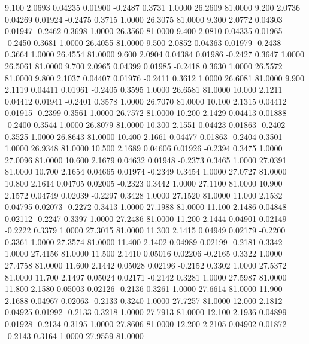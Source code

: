    9.100   2.0693   0.04235   0.01900  -0.2487   0.3731   1.0000  26.2609  81.0000
   9.200   2.0736   0.04269   0.01924  -0.2475   0.3715   1.0000  26.3075  81.0000
   9.300   2.0772   0.04303   0.01947  -0.2462   0.3698   1.0000  26.3560  81.0000
   9.400   2.0810   0.04335   0.01965  -0.2450   0.3681   1.0000  26.4055  81.0000
   9.500   2.0852   0.04363   0.01979  -0.2438   0.3664   1.0000  26.4554  81.0000
   9.600   2.0904   0.04384   0.01986  -0.2427   0.3647   1.0000  26.5061  81.0000
   9.700   2.0965   0.04399   0.01985  -0.2418   0.3630   1.0000  26.5572  81.0000
   9.800   2.1037   0.04407   0.01976  -0.2411   0.3612   1.0000  26.6081  81.0000
   9.900   2.1119   0.04411   0.01961  -0.2405   0.3595   1.0000  26.6581  81.0000
  10.000   2.1211   0.04412   0.01941  -0.2401   0.3578   1.0000  26.7070  81.0000
  10.100   2.1315   0.04412   0.01915  -0.2399   0.3561   1.0000  26.7572  81.0000
  10.200   2.1429   0.04413   0.01888  -0.2400   0.3544   1.0000  26.8079  81.0000
  10.300   2.1551   0.04423   0.01863  -0.2402   0.3525   1.0000  26.8643  81.0000
  10.400   2.1661   0.04477   0.01863  -0.2404   0.3501   1.0000  26.9348  81.0000
  10.500   2.1689   0.04606   0.01926  -0.2394   0.3475   1.0000  27.0096  81.0000
  10.600   2.1679   0.04632   0.01948  -0.2373   0.3465   1.0000  27.0391  81.0000
  10.700   2.1654   0.04665   0.01974  -0.2349   0.3454   1.0000  27.0727  81.0000
  10.800   2.1614   0.04705   0.02005  -0.2323   0.3442   1.0000  27.1100  81.0000
  10.900   2.1572   0.04749   0.02039  -0.2297   0.3428   1.0000  27.1520  81.0000
  11.000   2.1532   0.04795   0.02073  -0.2272   0.3413   1.0000  27.1988  81.0000
  11.100   2.1486   0.04848   0.02112  -0.2247   0.3397   1.0000  27.2486  81.0000
  11.200   2.1444   0.04901   0.02149  -0.2222   0.3379   1.0000  27.3015  81.0000
  11.300   2.1415   0.04949   0.02179  -0.2200   0.3361   1.0000  27.3574  81.0000
  11.400   2.1402   0.04989   0.02199  -0.2181   0.3342   1.0000  27.4156  81.0000
  11.500   2.1410   0.05016   0.02206  -0.2165   0.3322   1.0000  27.4758  81.0000
  11.600   2.1442   0.05028   0.02196  -0.2152   0.3302   1.0000  27.5372  81.0000
  11.700   2.1497   0.05024   0.02171  -0.2142   0.3281   1.0000  27.5987  81.0000
  11.800   2.1580   0.05003   0.02126  -0.2136   0.3261   1.0000  27.6614  81.0000
  11.900   2.1688   0.04967   0.02063  -0.2133   0.3240   1.0000  27.7257  81.0000
  12.000   2.1812   0.04925   0.01992  -0.2133   0.3218   1.0000  27.7913  81.0000
  12.100   2.1936   0.04899   0.01928  -0.2134   0.3195   1.0000  27.8606  81.0000
  12.200   2.2105   0.04902   0.01872  -0.2143   0.3164   1.0000  27.9559  81.0000
